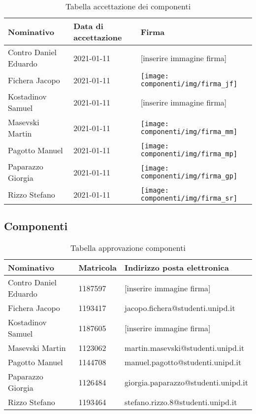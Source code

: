 \documentclass[../piano_di_progetto.tex]{subfiles}
\begin{document}
\begin{table}[!ht]
	\centering
	\begin{tabular}{|l|l|l|}
		\hline
		\rowcolor{lightgray}
		\textbf{Nominativo} & \textbf{Data di accettazione} & \textbf{Firma} \\ 
		\hline
		Contro Daniel Eduardo & 2021-01-11 & [inserire immagine firma] \\ 
		\hline
		Fichera Jacopo & 2021-01-11 & \texttt{[image: componenti/img/firma\_jf]} \\ 
		\hline
		Kostadinov Samuel & 2021-01-11 & [inserire immagine firma] \\
		\hline
		Masevski Martin & 2021-01-11 & \texttt{[image: componenti/img/firma\_mm]} \\ 
		\hline
		Pagotto Manuel & 2021-01-11 & \texttt{[image: componenti/img/firma\_mp]}  \\ 
		\hline
		Paparazzo Giorgia & 2021-01-11 & \texttt{[image: componenti/img/firma\_gp]} \\
		\hline
		Rizzo Stefano & 2021-01-11 & \texttt{[image: componenti/img/firma\_sr]}  \\ 
		\hline

	\end{tabular}
		\caption{Tabella accettazione dei componenti}
\end{table}

\subsection{Componenti}%
\label{sub:comp}

\begin{table}[!ht]
	\centering
	\begin{tabular}{|l|l|l|}
		\hline
		\rowcolor{lightgray}
		\textbf{Nominativo} & \textbf{Matricola} & \textbf{Indirizzo posta elettronica} \\ 
		\hline
		Contro Daniel Eduardo & 1187597 & [inserire immagine firma] \\ 
		\hline
		Fichera Jacopo & 1193417  & jacopo.fichera@studenti.unipd.it \\ 
		\hline
		Kostadinov Samuel & 1187605 & [inserire immagine firma] \\ 
		\hline
		Masevski Martin & 1123062 & martin.masevski@studenti.unipd.it \\ 
		\hline
		Pagotto Manuel & 1144708 & manuel.pagotto@studenti.unipd.it \\ 
		\hline
		Paparazzo Giorgia & 1126484 & giorgia.paparazzo@studenti.unipd.it \\ 
		\hline
		Rizzo Stefano & 1193464 & stefano.rizzo.8@studenti.unipd.it \\ 
		\hline
	\end{tabular}
		\caption{Tabella approvazione componenti}
\end{table}
\end{document}

